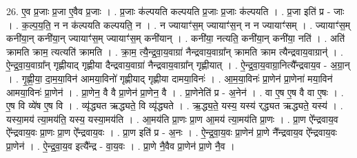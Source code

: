 \documentclass[17pt]{extarticle}
\begin{document}
26. ए॒व प्र॒जाः प्र॒जा ए॒वैव प्र॒जाः । . प्र॒जाः क॑ल्पयति कल्पयति प्र॒जाः प्र॒जाः क॑ल्पयति । . प्र॒जा इति॑ प्र - जाः । . क॒ल्प॒य॒ति॒ न न क॑ल्पयति कल्पयति॒ न । . न ज्यायाꣳ॑स॒म् ज्यायाꣳ॑स॒न् न न ज्यायाꣳ॑सम् । . ज्यायाꣳ॑स॒म् कनी॑या॒न् कनी॑या॒न् ज्यायाꣳ॑स॒म् ज्यायाꣳ॑स॒म् कनी॑यान् । . कनी॑या॒ नत्यति॒ कनी॑या॒न् कनी॑या॒ नति॑ । . अति॑ क्रामति क्राम॒ त्यत्यति॑ क्रामति । . क्रा॒म॒ त्यै॒न्द्र॒वा॒य॒वाग्रा॑ नैन्द्रवाय॒वाग्रा᳚न् क्रामति क्राम त्यैन्द्रवाय॒वाग्रान्॑ । . ऐ॒न्द्र॒वा॒य॒वाग्रा᳚न् गृह्णीयाद् गृह्णीया दैन्द्रवाय॒वाग्रा॑ नैन्द्रवाय॒वाग्रा᳚न् गृह्णीयात् । . ऐ॒न्द्र॒वा॒य॒वाग्रा॒नित्यै᳚न्द्रवाय॒व - अ॒ग्रा॒न् । . गृ॒ह्णी॒या॒ दा॒म॒या॒विन॑ आमया॒विनो॑ गृह्णीयाद् गृह्णीया दामया॒विनः॑ । . आ॒म॒या॒विनः॑ प्रा॒णेन॑ प्रा॒णेना॑ मया॒विन॑ आमया॒विनः॑ प्रा॒णेन॑ । . प्रा॒णेन॒ वै वै प्रा॒णेन॑ प्रा॒णेन॒ वै । . प्रा॒णेनेति॑ प्र - अ॒नेन॑ । . वा ए॒ष ए॒ष वै वा ए॒षः । . ए॒ष वि व्ये॑ष ए॒ष वि । . व्यृ॑द्ध्यत ऋद्ध्यते॒ वि व्यृ॑द्ध्यते । . ऋ॒द्ध्य॒ते॒ यस्य॒ यस्य॑ र्‌द्ध्यत ऋद्ध्यते॒ यस्य॑ । . यस्या॒मय॑ त्या॒मय॑ति॒ यस्य॒ यस्या॒मय॑ति । . आ॒मय॑ति प्रा॒णः प्रा॒ण आ॒मय॑ त्या॒मय॑ति प्रा॒णः । . प्रा॒ण ऐ᳚न्द्रवाय॒व ऐ᳚न्द्रवाय॒वः प्रा॒णः प्रा॒ण ऐ᳚न्द्रवाय॒वः । . प्रा॒ण इति॑ प्र - अ॒नः । . ऐ॒न्द्र॒वा॒य॒वः प्रा॒णेन॑ प्रा॒णे नै᳚न्द्रवाय॒व ऐ᳚न्द्रवाय॒वः प्रा॒णेन॑ । . ऐ॒न्द्र॒वा॒य॒व इत्यै᳚न्द्र - वा॒य॒वः । . प्रा॒णे नै॒वैव प्रा॒णेन॑ प्रा॒णे नै॒व । \newline
\end{document}
